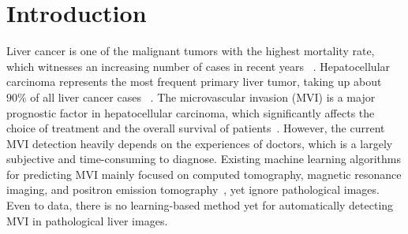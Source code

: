 \documentclass[letterpaper]{article} %
\begin{document}
\begin{abstract}
\end{abstract}

\section{Introduction}
Liver cancer is one of the malignant tumors with the highest mortality rate,
which witnesses an increasing number of cases
in recent years ~\cite{d2017management}.
Hepatocellular carcinoma represents the most frequent primary liver tumor,
taking up about $90\%$ of all liver cancer cases ~\cite{perumpail2017clinical}.
The microvascular invasion (MVI) is a major prognostic factor in hepatocellular carcinoma, which significantly affects the choice of treatment and the overall survival of patients~\cite{sumie2008microvascular,rodriguezperalvarez2013a}.
However, the current MVI detection heavily depends on the experiences
of doctors, which is a largely
subjective and time-consuming to diagnose.
Existing machine learning algorithms for predicting MVI
mainly focused on computed tomography, magnetic resonance imaging, and positron emission tomography~\cite{cuccurullo2018microvascular}, yet ignore pathological images.
Even to data, there is no  learning-based method  yet for
automatically detecting MVI in pathological liver images.
\end{document}
